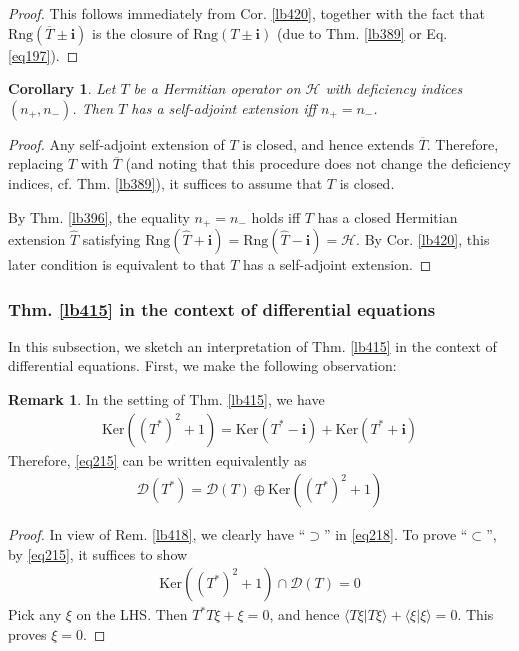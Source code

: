 \documentclass[12pt,b5paper,notitlepage]{article}
\theoremstyle{definition}
\newtheorem{rem}[df]{Remark}
\theoremstyle{plain}
\newtheorem{co}[df]{Corollary}
\newcommand{\wht}{\widehat}
\newcommand{\ovl}{\overline}
\newcommand{\Dom}{\mathscr{D}}
\newcommand{\bk}[1]{\langle {#1}\rangle}
\newcommand{\im}{\mathbf{i}}
\newcommand{\Ker}{\mathrm{Ker}}
\newcommand{\Rng}{\mathrm{Rng}}
\newcommand{\MH}{\mathcal H}
\numberwithin{equation}{section}
\begin{document}
\begin{proof}
This follows immediately from Cor. \ref{lb420}, together with the fact that $\Rng(\ovl T\pm\im)$ is the closure of $\Rng(T\pm\im)$ (due to Thm. \ref{lb389} or Eq. \eqref{eq197}).
\end{proof}


\begin{co}\label{lb424}
Let $T$ be a Hermitian operator on $\MH$ with deficiency indices $(n_+,n_-)$. Then $T$ has a self-adjoint extension iff $n_+=n_-$.
\end{co}

\begin{proof}
Any self-adjoint extension of $T$ is closed, and hence extends $\ovl T$. Therefore, replacing $T$ with $\ovl T$ (and noting that this procedure does not change the deficiency indices, cf. Thm. \ref{lb389}), it suffices to assume that $T$ is closed.

By Thm. \ref{lb396}, the equality $n_+=n_-$ holds iff $T$ has a closed Hermitian extension $\wht T$ satisfying $\Rng(\wht T+\im)=\Rng(\wht T-\im)=\MH$. By Cor. \ref{lb420}, this later condition is equivalent to that $T$ has a self-adjoint extension.
\end{proof}







\subsubsection{Thm. \ref{lb415} in the context of differential equations}

In this subsection, we sketch an interpretation of Thm. \ref{lb415} in the context of differential equations. First, we make the following observation:
\begin{rem}\label{lb419}
In the setting of Thm. \ref{lb415}, we have
\begin{align}\label{eq218}
\Ker((T^*)^2+1)=\Ker(T^*-\im)+\Ker(T^*+\im)
\end{align}
Therefore, \eqref{eq215} can be written equivalently as
\begin{align}
\Dom(T^*)=\Dom(T)\oplus \Ker((T^*)^2+1)
\end{align}
\end{rem}

\begin{proof}
In view of Rem. \ref{lb418}, we clearly have ``$\supset$'' in \eqref{eq218}. To prove ``$\subset$'', by \eqref{eq215}, it suffices to show
\begin{align*}
\Ker((T^*)^2+1)\cap\Dom(T)=0
\end{align*}
Pick any $\xi$ on the LHS. Then $T^*T\xi+\xi=0$, and hence $\bk{T\xi|T\xi}+\bk{\xi|\xi}=0$. This proves $\xi=0$.
\end{proof}
\end{document}
